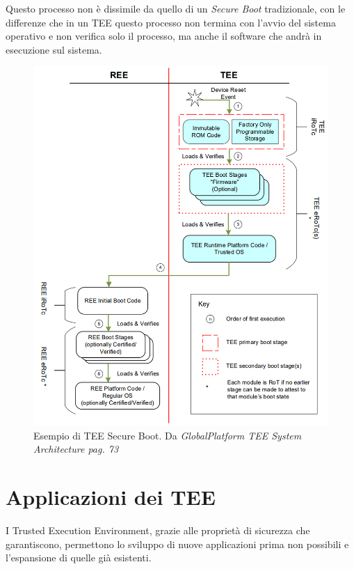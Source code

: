 \documentclass[12pt,italian]{report}
\begin{document}
	\bigbreak
	
	Questo processo non è dissimile da quello di un \textit{Secure Boot} tradizionale, con le differenze che in un TEE questo processo non termina con l'avvio del sistema operativo e non verifica solo il processo, ma anche il software che andrà in esecuzione sul sistema.
	
	\begin{figure}
		\centering
		\includegraphics[width=1\textwidth]{immagini/TEE_Secure_Boot}
		\caption{
			Esempio di TEE Secure Boot. 
			Da \textit{GlobalPlatform TEE System Architecture pag. 73}
			\cite{gp2020systemarchitecture}
		}
		\label{fig:tee-secure-boot}
	\end{figure}
	
	\newpage
	
	\section{Applicazioni dei TEE}
	\label{sec:applicazioni}
	I Trusted Execution Environment, grazie alle proprietà di sicurezza che garantiscono, permettono lo sviluppo di nuove applicazioni prima non possibili e l'espansione di quelle già esistenti.
	
\end{document}
